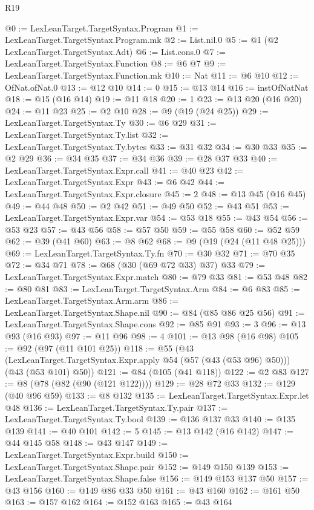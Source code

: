 \begin{lexlean}{R19}
\begin{coremodule}
@0 := LexLeanTarget.TargetSyntax.Program
@1 := LexLeanTarget.TargetSyntax.Program.mk
@2 := List.nil.{0}
@5 := @1 (@2 LexLeanTarget.TargetSyntax.Adt)
@6 := List.cons.{0}
@7 := LexLeanTarget.TargetSyntax.Function
@8 := @6 @7
@9 := LexLeanTarget.TargetSyntax.Function.mk
@10 := Nat
@11 := @6 @10
@12 := OfNat.ofNat.{0}
@13 := @12 @10
@14 := 0
@15 := @13 @14
@16 := instOfNatNat
@18 := @15 (@16 @14)
@19 := @11 @18
@20 := 1
@23 := @13 @20 (@16 @20)
@24 := @11 @23
@25 := @2 @10
@28 := @9 (@19 (@24 @25))
@29 := LexLeanTarget.TargetSyntax.Ty
@30 := @6 @29
@31 := LexLeanTarget.TargetSyntax.Ty.list
@32 := LexLeanTarget.TargetSyntax.Ty.bytes
@33 := @31 @32
@34 := @30 @33
@35 := @2 @29
@36 := @34 @35
@37 := @34 @36
@39 := @28 @37 @33
@40 := LexLeanTarget.TargetSyntax.Expr.call
@41 := @40 @23
@42 := LexLeanTarget.TargetSyntax.Expr
@43 := @6 @42
@44 := LexLeanTarget.TargetSyntax.Expr.closure
@45 := 2
@48 := @13 @45 (@16 @45)
@49 := @44 @48
@50 := @2 @42
@51 := @49 @50
@52 := @43 @51
@53 := LexLeanTarget.TargetSyntax.Expr.var
@54 := @53 @18
@55 := @43 @54
@56 := @53 @23
@57 := @43 @56
@58 := @57 @50
@59 := @55 @58
@60 := @52 @59
@62 := @39 (@41 @60)
@63 := @8 @62
@68 := @9 (@19 (@24 (@11 @48 @25)))
@69 := LexLeanTarget.TargetSyntax.Ty.fn
@70 := @30 @32
@71 := @70 @35
@72 := @34 @71
@78 := @68 (@30 (@69 @72 @33) @37) @33
@79 := LexLeanTarget.TargetSyntax.Expr.match
@80 := @79 @33
@81 := @53 @48
@82 := @80 @81
@83 := LexLeanTarget.TargetSyntax.Arm
@84 := @6 @83
@85 := LexLeanTarget.TargetSyntax.Arm.arm
@86 := LexLeanTarget.TargetSyntax.Shape.nil
@90 := @84 (@85 @86 @25 @56)
@91 := LexLeanTarget.TargetSyntax.Shape.cons
@92 := @85 @91
@93 := 3
@96 := @13 @93 (@16 @93)
@97 := @11 @96
@98 := 4
@101 := @13 @98 (@16 @98)
@105 := @92 (@97 (@11 @101 @25))
@118 := @55
    (@43 (LexLeanTarget.TargetSyntax.Expr.apply @54 (@57 (@43 (@53 @96) @50))) (@43 (@53 @101) @50))
@121 := @84 (@105 (@41 @118))
@122 := @2 @83
@127 := @8 (@78 (@82 (@90 (@121 @122))))
@129 := @28 @72 @33
@132 := @129 (@40 @96 @59)
@133 := @8 @132
@135 := LexLeanTarget.TargetSyntax.Expr.let @48
@136 := LexLeanTarget.TargetSyntax.Ty.pair
@137 := LexLeanTarget.TargetSyntax.Ty.bool
@139 := @136 @137 @33
@140 := @135 @139
@141 := @40 @101
@142 := 5
@145 := @13 @142 (@16 @142)
@147 := @44 @145 @58
@148 := @43 @147
@149 := LexLeanTarget.TargetSyntax.Expr.build
@150 := LexLeanTarget.TargetSyntax.Shape.pair
@152 := @149 @150 @139
@153 := LexLeanTarget.TargetSyntax.Shape.false
@156 := @149 @153 @137 @50
@157 := @43 @156
@160 := @149 @86 @33 @50
@161 := @43 @160
@162 := @161 @50
@163 := @157 @162
@164 := @152 @163
@165 := @43 @164

\end{coremodule}
\end{lexlean}
